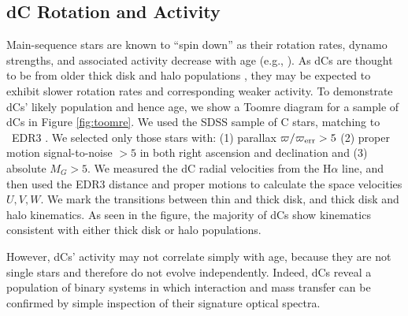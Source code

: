 \documentclass[twocolumn, tighten, times, astrosymb]{aastex631}
\begin{document}
\subsection{dC Rotation and Activity}
%
Main-sequence stars are known to ``spin down'' as their rotation rates, dynamo strengths, and associated activity decrease with age (e.g., \citealt{Kraft1967, Skumanich1972}). As dCs are thought to be from older thick disk and halo populations \citep{Green2013, Farihi2018}, they may be expected to exhibit slower rotation rates and corresponding weaker activity. To demonstrate dCs' likely population and hence age, we show a Toomre diagram \citep{Carney1988} for a sample of dCs in Figure \ref{fig:toomre}. We used the \citet{Green2013} SDSS sample of C stars, matching to \Gaia\ EDR3 \citep{GaiaEDR3}. We selected only those stars with: (1) parallax $\varpi / \varpi_{\rm{err}} > 5$ (2) proper motion signal-to-noise $> 5$ in both right ascension and declination and (3) absolute $M_G > 5$. We measured the dC radial velocities from the H$\alpha$ line, and then used the \Gaia EDR3 distance and proper motions to calculate the space velocities $U, V, W$. We mark the transitions between thin and thick disk, and thick disk and halo kinematics. As seen in the figure, the majority of dCs show kinematics consistent with either thick disk or halo populations.

However, dCs' activity may not correlate simply with age, because they are not single stars and therefore do not evolve independently. Indeed, dCs reveal a population of binary systems in which interaction and mass transfer can be confirmed by simple inspection of their signature optical spectra. 


\end{document}

